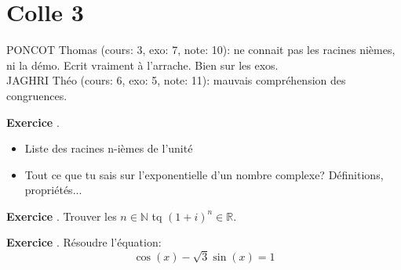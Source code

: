 \documentclass[10pt,a4paper]{article}
\newcounter{question}
\newcounter{exo}
\newenvironment{exo}{\vspace{0.5cm}\setcounter{question}{0}\addtocounter{exo}{1} \noindent \textbf{Exercice \theexo}. \normalsize }{\par}
\begin{document}
	\section*{Colle 3}
	\setcounter{exo}{0}
	PONCOT Thomas (cours: 3, exo: 7, note: 10): ne connait pas les racines nièmes, ni la démo. Ecrit vraiment à l'arrache. Bien sur les exos.\\
	JAGHRI Théo (cours: 6, exo: 5, note: 11): mauvais compréhension des congruences. 
	
	
	\begin{exo}
		\begin{itemize}
			\item Liste des racines n-ièmes de l'unité
			\item Tout ce que tu sais sur l'exponentielle d'un nombre complexe? Définitions, propriétés...
		\end{itemize}
	\end{exo}

	\begin{exo}
		Trouver les $n \in \mathbb{N}$ tq $(1 + i)^n \in \mathbb{R}$.
	\end{exo}

	\begin{exo}
		Résoudre l'équation:
		$$\cos(x) - \sqrt{3} \sin(x) = 1$$
	\end{exo}
%	
\end{document}
